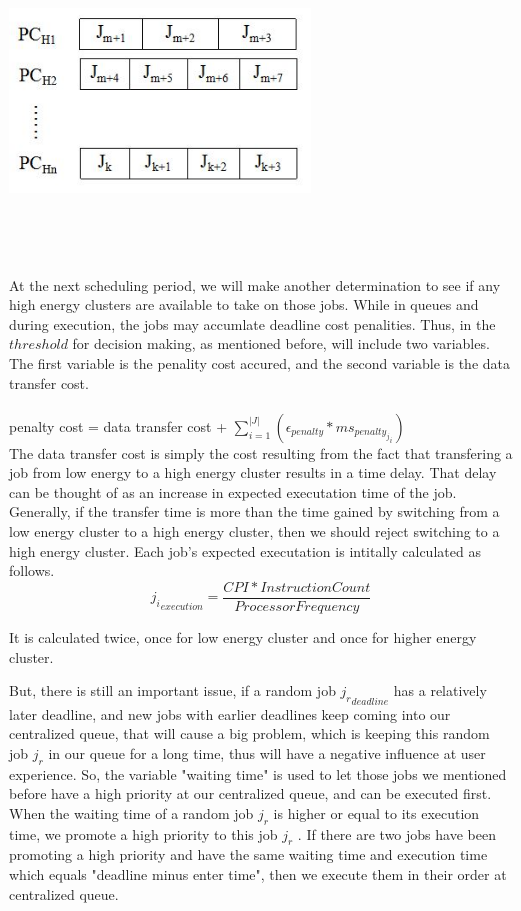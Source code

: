 \documentclass[conference]{IEEEtran}
\begin{document}
\includegraphics[width=8cm,height=8cm,keepaspectratio]{3.JPG}\\
\\At the next scheduling period, we will make another determination to see if any high energy clusters are available to take on those jobs. While in queues and during execution, the jobs may accumlate deadline cost penalities. Thus, in the $threshold$ for decision making, as mentioned before, will include two variables. The first variable is the penality cost accured, and the second variable is the data transfer cost. 
\\
\\penalty cost = data transfer cost + $\sum \limits_{i=1}^{|J|} (\epsilon_{penalty} * ms_{{penalty_j}_i})$\\
\newline
The data transfer cost is simply the cost resulting from the fact that transfering a job from low energy to a high energy cluster results in a time delay. That delay can be thought of as an increase in expected executation time of the job. Generally, if the transfer time is more than the time gained by switching from a low energy cluster to a high energy cluster, then we should reject switching to a high energy cluster. Each job's expected executation is intitally calculated as follows.
$${j_i}_{execution} = \frac{CPI*Instruction Count}{Processor Frequency}$$ 

It is calculated twice, once for low energy cluster and once for higher energy cluster.

But, there is still an important issue, if a random job ${j_r}_{deadline}$ has a relatively later deadline, and new jobs with earlier deadlines keep coming into our centralized queue, that will cause a big problem, which is keeping this random job $j_r$ in our queue for a long time, thus will have a negative influence at user experience. So, the variable "waiting time" is used to let those jobs we mentioned before have a high priority at our centralized queue, and can be executed first. When the waiting time of a random job $j_r$ is higher or equal to its execution time, we promote a high priority to this job $j_r$ . If there are two jobs have been promoting a high priority and have the same waiting time and execution time which equals "deadline minus enter time", then we execute them in their order at centralized queue.\\
\end{document}
